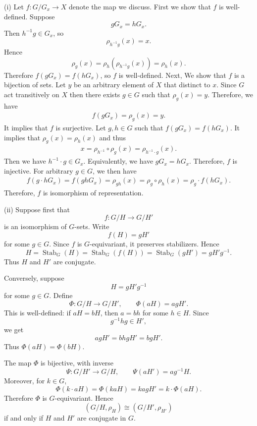 \begin{solution}
    (i) Let $f:G/G_x\to X$ denote the map we discuss. First we show that \(f\) is well-defined. Suppose
\[
gG_x=hG_x.
\]
Then \(h^{-1}g\in G_x\), so
\[
\rho_{h^{-1}g}(x)=x.
\]
Hence
\[
\rho_g(x)=\rho_h(\rho_{h^{-1}g}(x))=\rho_h(x).
\]
Therefore \(f(gG_x)=f(hG_x)\), so \(f\) is well-defined.
    Next, We show that $f$ is a bijection of sets. Let $y$ be an arbitrary element of $X$ that distinct to $x$. 
    Since $G$ act transitively on $X$ then there exists $g\in G$ such that $\rho_g(x)=y$. Therefore, we have 
    \begin{align*}
        f(gG_x) = \rho_g(x) = y.
    \end{align*}
    It implies that $f$ is surjective. Let $g,h\in G$ such that $f(gG_x) = f(hG_x)$. It implies that $\rho_g(x)=\rho_h(x)$ and thus 
    \begin{align*}
        x = \rho_{h^{-1}}\circ\rho_g(x) = \rho_{h^{-1}\cdot g}(x).
    \end{align*} 
    Then we have $h^{-1}\cdot g\in G_x$. Equivalently, we have $gG_x = hG_x$. Therefore, $f$ is injective. 
    For arbitrary $g\in G$, we then have 
    \begin{align*}
        f(g\cdot hG_x) = f(gh G_x) = \rho_{gh}(x) = \rho_g\circ\rho_h(x) = \rho_g \cdot f(hG_x).
    \end{align*}
    Therefore, $f$ is isomorphism of representation.

    (ii) Suppose first that
\[
f:G/H\to G/H'
\]
is an isomorphism of \(G\)-sets. Write
\[
f(H)=gH'
\]
for some \(g\in G\). Since \(f\) is \(G\)-equivariant, it preserves stabilizers. Hence
\[
H=\operatorname{Stab}_G(H)
=\operatorname{Stab}_G(f(H))
=\operatorname{Stab}_G(gH')
=gH'g^{-1}.
\]
Thus \(H\) and \(H'\) are conjugate.

Conversely, suppose
\[
H=gH'g^{-1}
\]
for some \(g\in G\). Define
\[
\Phi:G/H\to G/H',
\qquad
\Phi(aH)=agH'.
\]
This is well-defined: if \(aH=bH\), then \(a=bh\) for some \(h\in H\). Since
\[
g^{-1}hg\in H',
\]
we get
\[
agH'=bhgH'=bgH'.
\]
Thus \(\Phi(aH)=\Phi(bH)\).

The map \(\Phi\) is bijective, with inverse
\[
\Psi:G/H'\to G/H,
\qquad
\Psi(aH')=ag^{-1}H.
\]
Moreover, for \(k\in G\),
\[
\Phi(k\cdot aH)
=
\Phi(kaH)
=
kagH'
=
k\cdot \Phi(aH).
\]
Therefore \(\Phi\) is \(G\)-equivariant. Hence
\[
(G/H,\rho_H)\cong (G/H',\rho_{H'})
\]
if and only if \(H\) and \(H'\) are conjugate in \(G\).
\end{solution}



